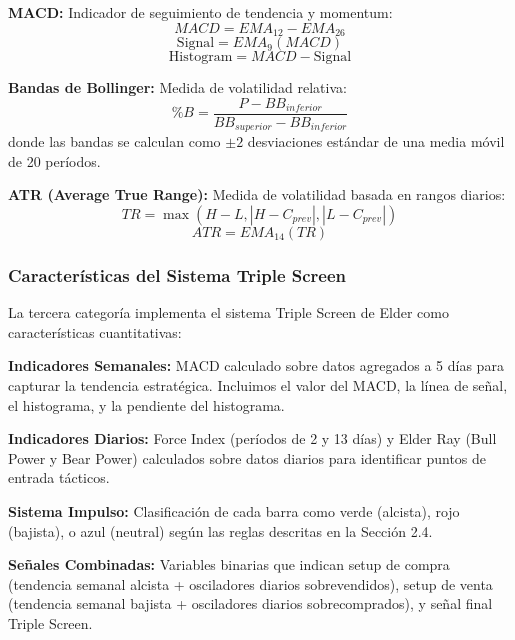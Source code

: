 \documentclass[11pt,a4paper]{article}
\begin{document}
\textbf{MACD:} Indicador de seguimiento de tendencia y momentum:
\begin{equation}
MACD = EMA_{12} - EMA_{26}
\end{equation}
\begin{equation}
\text{Signal} = EMA_9(MACD)
\end{equation}
\begin{equation}
\text{Histogram} = MACD - \text{Signal}
\end{equation}

\textbf{Bandas de Bollinger:} Medida de volatilidad relativa:
\begin{equation}
\%B = \frac{P - BB_{inferior}}{BB_{superior} - BB_{inferior}}
\end{equation}
donde las bandas se calculan como $\pm 2$ desviaciones estándar de una media móvil de 20 períodos.

\textbf{ATR (Average True Range):} Medida de volatilidad basada en rangos diarios:
\begin{equation}
TR = \max(H-L, |H-C_{prev}|, |L-C_{prev}|)
\end{equation}
\begin{equation}
ATR = EMA_{14}(TR)
\end{equation}

\subsubsection{Características del Sistema Triple Screen}

La tercera categoría implementa el sistema Triple Screen de Elder como características cuantitativas:

\textbf{Indicadores Semanales:} MACD calculado sobre datos agregados a 5 días para capturar la tendencia estratégica. Incluimos el valor del MACD, la línea de señal, el histograma, y la pendiente del histograma.

\textbf{Indicadores Diarios:} Force Index (períodos de 2 y 13 días) y Elder Ray (Bull Power y Bear Power) calculados sobre datos diarios para identificar puntos de entrada tácticos.

\textbf{Sistema Impulso:} Clasificación de cada barra como verde (alcista), rojo (bajista), o azul (neutral) según las reglas descritas en la Sección 2.4.

\textbf{Señales Combinadas:} Variables binarias que indican setup de compra (tendencia semanal alcista + osciladores diarios sobrevendidos), setup de venta (tendencia semanal bajista + osciladores diarios sobrecomprados), y señal final Triple Screen.
\end{document}
